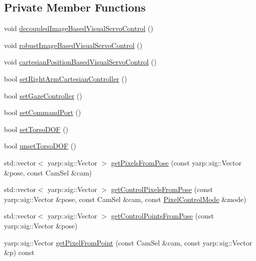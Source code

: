 \subsection*{Private Member Functions}
\begin{DoxyCompactItemize}
\item 
void \hyperlink{classVisualServoingServer_a79aafac31c32f2028836e1ef0f69dd99}{decoupled\+Image\+Based\+Visual\+Servo\+Control} ()
\item 
void \hyperlink{classVisualServoingServer_a34576cda7f4ed36dfae809a48f364d2b}{robust\+Image\+Based\+Visual\+Servo\+Control} ()
\item 
void \hyperlink{classVisualServoingServer_a9ad2bd94ff95fde9e309c4fb62de7377}{cartesian\+Position\+Based\+Visual\+Servo\+Control} ()
\item 
bool \hyperlink{classVisualServoingServer_a080585bc03f073b70a10bcdd6b36b309}{set\+Right\+Arm\+Cartesian\+Controller} ()
\item 
bool \hyperlink{classVisualServoingServer_a1cea1b6c32f9719cd63c36224fc1b9d2}{set\+Gaze\+Controller} ()
\item 
bool \hyperlink{classVisualServoingServer_a27c26de8415dee1c3165edd1e1d362a2}{set\+Command\+Port} ()
\item 
bool \hyperlink{classVisualServoingServer_a9e031793c83063b80035f8769d28a99f}{set\+Torso\+D\+OF} ()
\item 
bool \hyperlink{classVisualServoingServer_a509750822f0f1e0db26d54288f8eb1fd}{unset\+Torso\+D\+OF} ()
\item 
std\+::vector$<$ yarp\+::sig\+::\+Vector $>$ \hyperlink{classVisualServoingServer_a04f3caed0ac350b3579efeb4cd548eb8}{get\+Pixels\+From\+Pose} (const yarp\+::sig\+::\+Vector \&pose, const Cam\+Sel \&cam)
\item 
std\+::vector$<$ yarp\+::sig\+::\+Vector $>$ \hyperlink{classVisualServoingServer_a67bfc714271a28bf55fa49c89019b53c}{get\+Control\+Pixels\+From\+Pose} (const yarp\+::sig\+::\+Vector \&pose, const Cam\+Sel \&cam, const \hyperlink{classVisualServoingServer_a3a1cce02f57cebb9056da5653d4dff0e}{Pixel\+Control\+Mode} \&mode)
\item 
std\+::vector$<$ yarp\+::sig\+::\+Vector $>$ \hyperlink{classVisualServoingServer_ac9e6020f30b6df05db3fc34a44fee0d4}{get\+Control\+Points\+From\+Pose} (const yarp\+::sig\+::\+Vector \&pose)
\item 
yarp\+::sig\+::\+Vector \hyperlink{classVisualServoingServer_a997029621c723c1e9962b35a917167cc}{get\+Pixel\+From\+Point} (const Cam\+Sel \&cam, const yarp\+::sig\+::\+Vector \&p) const

\end{DoxyCompactItemize}
